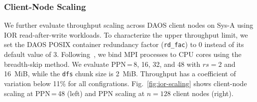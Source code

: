 



\subsubsection{Client-Node Scaling}
\label{sec:multinode}

We further evaluate throughput scaling across DAOS client nodes on Sys-A using IOR read-after-write workloads. To characterize the upper throughput limit, we set the DAOS POSIX container redundancy factor (\texttt{rd\_fac}) to 0 instead of its default value of 3. Following~\cite{DAOS-aurora-20-node-test2024scw}, we bind MPI processes to CPU cores using the breadth-skip method. We evaluate PPN\,=\,8, 16, 32, and 48 with $rs{=}2$ and 16~MiB, while the \texttt{dfs} chunk size is 2~MiB. Throughput has a coefficient of variation below 11\% for all configrations. Fig.~\ref{fig:ior-scaling} shows client-node scaling at PPN\,=\,48 (left) and PPN scaling at $n{=}128$ client nodes (right).

